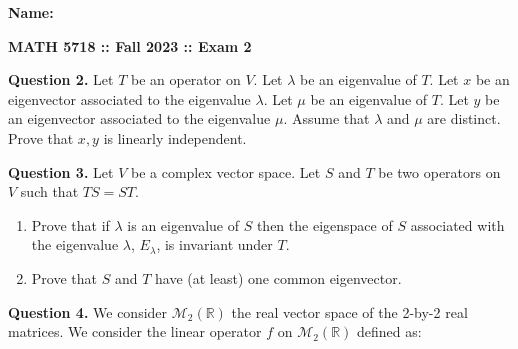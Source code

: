 \documentclass[11pt]{amsart}
\begin{document}
\hfill \textbf{Name:\underline{\hspace*{5cm}}}\\
\begin{center}
\textbf{MATH 5718 :: Fall 2023 :: Exam 2}\\
\end{center}
\vspace{.5cm}

\vspace{.5cm}




\newpage
\noindent
{\bf Question 2.} 
Let $T$ be an operator on $V$. 
Let $\lambda$ be an eigenvalue of $T$. Let $x$ be an eigenvector associated to the eigenvalue $\lambda$.
Let $\mu$ be an eigenvalue of $T$. Let $y$ be an eigenvector associated to the eigenvalue $\mu$.
Assume that $\lambda$ and $\mu$ are distinct. Prove that $x, y$ is linearly independent.


\newpage \noindent
{\bf Question 3.} 
Let $V$ be a complex vector space. Let $S$ and $T$ be two operators on $V$ such that $TS = ST$.
\begin{enumerate}[label=(\alph*)]
\item Prove that if $\lambda$ is an eigenvalue of $S$ then the eigenspace of $S$ associated with the eigenvalue $\lambda$,
$E_\lambda$, is invariant under $T$.
\item Prove that $S$ and $T$ have (at least) one common eigenvector.
\end{enumerate}

\newpage \noindent
{\bf Question 4.} 
We consider $\mathcal{M}_2(\mathbb{R})$ the real vector space of the 2-by-2 real matrices. 
We consider the linear operator $f$ on $\mathcal{M}_2(\mathbb{R})$ defined as:
\end{document}

